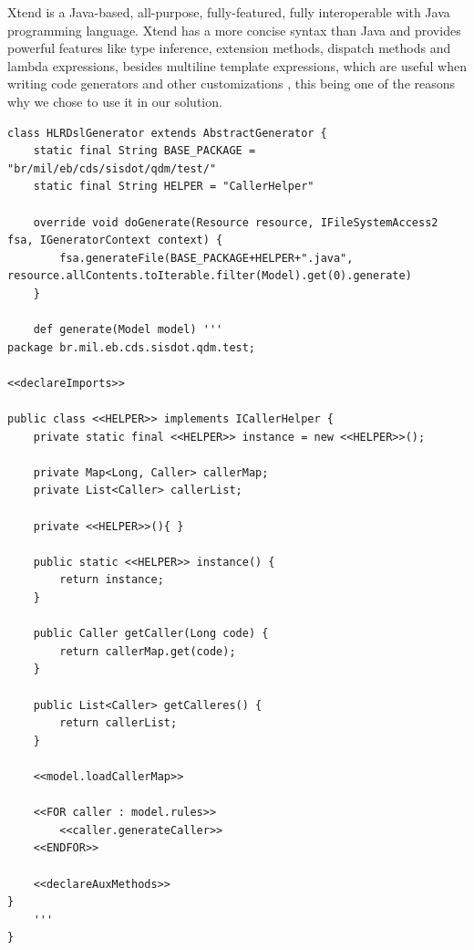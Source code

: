 \documentclass[AMA,STIX1COL,hidelinks]{WileyNJD-v2}
\begin{document}

Xtend is a Java-based, all-purpose, fully-featured, fully interoperable with Java programming language. Xtend has a more concise syntax than Java and provides powerful features like type inference, extension methods, dispatch methods and lambda expressions, besides multiline template expressions, which are useful when writing code generators and other customizations \cite{bettini2016}, this being one of the reasons why we chose to use it in our solution.

\begin{lstlisting}[frame=single, language=Xtend, caption={\it Code Generation}, label={code:xtend_generator}]
class HLRDslGenerator extends AbstractGenerator {
	static final String BASE_PACKAGE = "br/mil/eb/cds/sisdot/qdm/test/"
	static final String HELPER = "CallerHelper"

	override void doGenerate(Resource resource, IFileSystemAccess2 fsa, IGeneratorContext context) {		
		fsa.generateFile(BASE_PACKAGE+HELPER+".java", resource.allContents.toIterable.filter(Model).get(0).generate)
	}

	def generate(Model model) '''
package br.mil.eb.cds.sisdot.qdm.test;
		
<<declareImports>>

public class <<HELPER>> implements ICallerHelper {
	private static final <<HELPER>> instance = new <<HELPER>>();
	
	private Map<Long, Caller> callerMap;
	private List<Caller> callerList;
	
	private <<HELPER>>(){ }
	
	public static <<HELPER>> instance() {
		return instance;
	}
	
	public Caller getCaller(Long code) {
		return callerMap.get(code);
	}
	
	public List<Caller> getCalleres() {
		return callerList;
	}
	
	<<model.loadCallerMap>>
	
	<<FOR caller : model.rules>>
		<<caller.generateCaller>>
	<<ENDFOR>>
			
	<<declareAuxMethods>>
}
	'''
}
\end{lstlisting}
\end{document}
